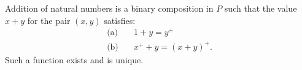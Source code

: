 Addition of natural numbers is a binary composition in $P$ such that the value $x + y$ for the pair $(x,y)$ satisfies:
\begin{align}
\text{(a)} &\quad 1 + y = y^+ \\
\text{(b)} &\quad x^+ + y = (x + y)^+.
\end{align}
Such a function exists and is unique.
